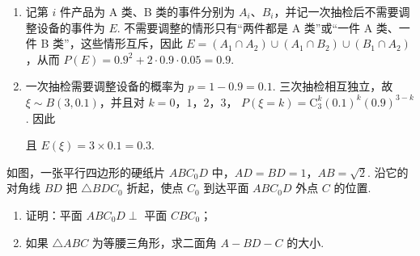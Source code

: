 \begin{solution}
\begin{enumerate}
\item 记第 \(i\) 件产品为 A 类、B 类的事件分别为 \(A_i\)、\(B_i\)，并记一次抽检后不需要调整设备的事件为 \(E\).
不需要调整的情形只有“两件都是 A 类”或“一件 A 类、一件 B 类”，这些情形互斥，因此
\(E=(A_1\cap A_2)\cup(A_1\cap B_2)\cup(B_1\cap A_2)\)，从而
\(P(E)=0.9^2+2\cdot0.9\cdot0.05=0.9\).

\item 一次抽检需要调整设备的概率为 \(p=1-0.9=0.1\). 三次抽检相互独立，故
\(\xi\sim B(3,0.1)\)，并且对 \(k=0\)，\(1\)，\(2\)，\(3\)，
\(P(\xi=k)=\mathrm C_3^k(0.1)^k(0.9)^{3-k}\). 因此

\noindent{}

且 \(E(\xi)=3\times0.1=0.3\).
\end{enumerate}
\end{solution}

\begin{problem}
如图，一张平行四边形的硬纸片 \(ABC_0D\) 中，\(AD=BD=1\)，\(AB=\sqrt2\). 沿它的对角线 \(BD\) 把 \(\triangle BDC_0\) 折起，使点 \(C_0\) 到达平面 \(ABC_0D\) 外点 \(C\) 的位置.

\begin{enumerate}
\item 证明：平面 \(ABC_0D\perp\) 平面 \(CBC_0\)；
\item 如果 \(\triangle ABC\) 为等腰三角形，求二面角 \(A-BD-C\) 的大小.
\end{enumerate}

\end{problem}

